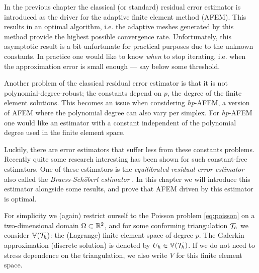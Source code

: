 \documentclass[thesis.tex]{subfiles}
\begin{document}
In the previous chapter the classical (or standard) residual error estimator is introduced as the driver for the
adaptive finite element method (AFEM). This results in an optimal algorithm, i.e. the adaptive meshes
generated by this method provide the highest possible convergence rate. Unfortunately, this asymptotic result
is a bit unfortunate for practical purposes due to the unknown constants. In practice
one would like to know \emph{when} to stop iterating, i.e. when the approximation error is small enough --- say
below some threshold. 

Another problem of the classical residual error estimator is that it is not polynomial-degree-robust; 
the constants depend on $p$, the degree of the finite element solutions. This becomes an issue
when considering \emph{hp}-AFEM, a version of AFEM where the polynomial degree can also vary
per simplex. For \emph{hp}-AFEM one would like an estimator with a constant independent of the polynomial degree
used in the finite element space.

Luckily, there are error estimators that suffer less from these constants problems. Recently quite
some research interesting has been shown for such constant-free estimators. One of these estimators is the
\emph{equilibrated residual error estimator} also called the \emph{Braess-Sch\"oberl estimator} \cite{braessequil, braessequilrobust,ernequil}.
In this chapter we will introduce this estimator alongside some results, and prove that AFEM driven 
by this estimator is optimal.

For simplicity we (again) restrict ourself to the Poisson problem \eqref{eq:poisson} on a two-dimensional domain $\Omega \subset \mathbb{R}^2$,
and for some conforming triangulation $\mathcal{T}_h$ we consider $\mathbb{V}(\mathcal{T}_h)$: the (Lagrange) finite element space of degree $p$. 
The Galerkin approximation (discrete solution) is denoted by $U_h \in \mathbb{V}(\mathcal{T}_h)$. If we do not need to stress dependence on the triangulation, we 
also write $V$ for this finite element space.
\end{document}
